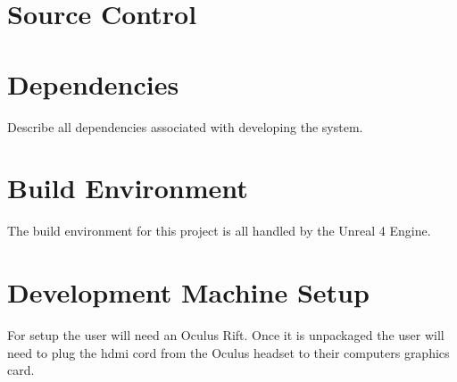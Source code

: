 \section{Source  Control}

\section{Dependencies}
Describe all dependencies associated with developing the system. 

\section{Build  Environment}
The build environment for this project is all handled by the Unreal 4 Engine.

\section{Development Machine Setup}
For setup the user will need an Oculus Rift. Once it is unpackaged the user will need to plug the hdmi cord from the Oculus headset to their computers graphics card. 


